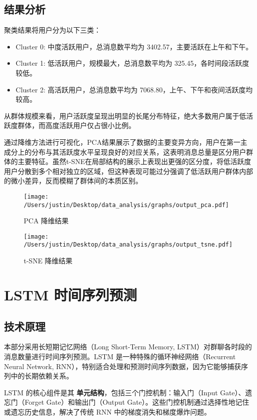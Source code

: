 \documentclass{paper}
\begin{document}
\subsection{结果分析}
聚类结果将用户分为以下三类：
\begin{itemize}
    \item Cluster 0: 中度活跃用户，总消息数平均为 3402.57，主要活跃在上午和下午。
    \item Cluster 1: 低活跃用户，规模最大，总消息数平均为 325.45，各时间段活跃度较低。
    \item Cluster 2: 高活跃用户，总消息数平均为 7068.80，上午、下午和夜间活跃度均较高。
\end{itemize}
从群体规模来看，用户活跃度呈现出明显的长尾分布特征，绝大多数用户属于低活跃度群体，而高度活跃用户仅占很小比例。

通过降维方法进行可视化，PCA结果展示了数据的主要变异方向，用户在第一主成分上的分布与其活跃度水平呈现良好的对应关系，这表明消息总量是区分用户群体的主要特征。虽然t-SNE在局部结构的展示上表现出更强的区分度，将低活跃度用户分散到多个相对独立的区域，但这种表现可能过分强调了低活跃用户群体内部的微小差异，反而模糊了群体间的本质区别。


\begin{figure}[H]
        \centering
        \texttt{[image: /Users/justin/Desktop/data\_analysis/graphs/output\_pca.pdf]}
        \caption{PCA 降维结果}
        \label{fig:pca}
\end{figure}
\begin{figure}[H]
        \centering
        \texttt{[image: /Users/justin/Desktop/data\_analysis/graphs/output\_tsne.pdf]}
        \caption{t-SNE 降维结果}
        \label{fig:tsne}
\end{figure}

\section{LSTM 时间序列预测}

\subsection{技术原理}

本部分采用长短期记忆网络（Long Short-Term Memory, LSTM）对群聊各时段的消息数量进行时间序列预测。LSTM 是一种特殊的循环神经网络（Recurrent Neural Network, RNN），特别适合处理和预测时间序列数据，因为它能够捕获序列中的长期依赖关系。

LSTM 的核心组件是其 \textbf{单元结构}，包括三个门控机制：输入门（Input Gate）、遗忘门（Forget Gate）和输出门（Output Gate）。这些门控机制通过选择性地记住或遗忘历史信息，解决了传统 RNN 中的梯度消失和梯度爆炸问题。
\end{document}
